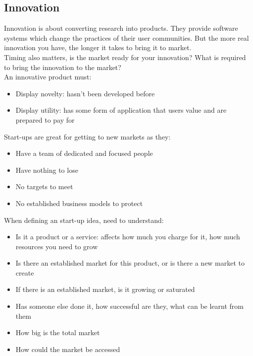 \documentclass{article}
\begin{document}
\subsection{Innovation}
Innovation is about converting research into products. They provide software systems which change the practices of their user communities. But the more real innovation you have, the longer it takes to bring it to market. \\
Timing also matters, is the market ready for your innovation? What is required to bring the innovation to the market? \\
An innovative product must:
\begin{itemize}
    \item Display novelty: hasn't been developed before
    \item Display utility: has some form of application that users value and are prepared to pay for
\end{itemize}
Start-ups are great for getting to new markets as they:
\begin{itemize}
    \item Have a team of dedicated and focused people
    \item Have nothing to lose
    \item No targets to meet
    \item No established business models to protect
\end{itemize}
When defining an start-up idea, need to understand:
\begin{itemize}
    \item Is it a product or a service: affects how much you charge for it, how much resources you need to grow
    \item Is there an established market for this product, or is there a new market to create
    \item If there is an established market, is it growing or saturated
    \item Has someone else done it, how successful are they, what can be learnt from them
    \item How big is the total market
    \item How could the market be accessed
\end{itemize}
\end{document}
